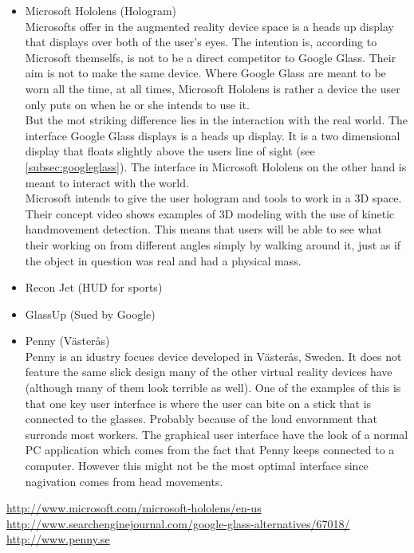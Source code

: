 \begin{itemize}
\item Microsoft Hololens (Hologram)\\
	Microsofts offer in the augmented reality device space is a heads up display that displays over both of the user's eyes. The intention is, according to Microsoft themselfs, is not to be a direct competitor to Google Glass. Their aim is not to make the same device. Where Google Glass are meant to be worn all the time, at all times, Microsoft Hololens is rather a device the user only puts on when he or she intends to use it.\\
	But the mot striking difference lies in the interaction with the real world. The interface Google Glass displays is a heads up display. It is a two dimensional display that floats slightly above the users line of sight (see \ref{subsec:googleglass}). The interface in Microsoft Hololens on the other hand is meant to interact with the world. \\
	Microsoft intends to give the user hologram and tools to work in a 3D space. Their concept video shows examples of 3D modeling with the use of kinetic handmovement detection. This means that users will be able to see what their working on from different angles simply by walking around it, just as if the object in question was real and had a physical mass.
\item Recon Jet (HUD for sports)
\item GlassUp (Sued by Google)
\item Penny (Västerås)\\
Penny is an idustry focues device developed in Västerås, Sweden. It does not feature the same slick design many of the other virtual reality devices have (although many of them look terrible as well). One of the examples of this is that one key user interface is where the user can bite on a stick that is connected to the glasses. Probably because of the loud envornment that surronds most workers.
The graphical user interface have the look of a normal PC application which comes from the fact that Penny keeps connected to a computer. However this might not be the most optimal interface since nagivation comes from head movements.
\end{itemize}

\url{http://www.microsoft.com/microsoft-hololens/en-us}
\url{http://www.searchenginejournal.com/google-glass-alternatives/67018/}
\url{http://www.penny.se}